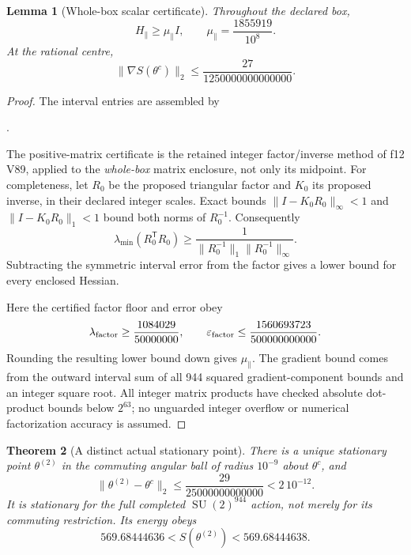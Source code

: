 \documentclass[11pt,oneside]{article}
\newtheorem{theorem}{Theorem}[section]
\newtheorem{lemma}[theorem]{Lemma}
\DeclareMathOperator{\SU}{SU}
\begin{document}
\begin{lemma}[Whole-box scalar certificate]
\label{lem:f13v8-scalar}
Throughout the declared box,
\[
 H_\parallel\ge
 \mu_\parallel I,\qquad
 \mu_\parallel=\frac{1855919}{10^8}.
\]
At the rational centre,
\[
 \|\nabla S(\theta^c)\|_2
 \le\frac{27}{1250000000000000}.
\]
\end{lemma}

\begin{proof}
The interval entries are assembled by
\begin{center}\small
{}.
\end{center}
The positive-matrix certificate is the
retained integer factor/inverse method of
f12 V89, applied to the \emph{whole-box}
matrix enclosure, not only its midpoint.
For completeness, let \(R_0\) be the proposed
triangular factor and \(K_0\) its proposed
inverse, in their declared integer scales.
Exact bounds
\(\|I-K_0R_0\|_\infty<1\) and
\(\|I-K_0R_0\|_1<1\) bound both norms of
\(R_0^{-1}\). Consequently
\[
 \lambda_{\min}(R_0^{\mathsf T}R_0)
 \ge\frac1{\|R_0^{-1}\|_1\|R_0^{-1}\|_\infty}.
\]
Subtracting the symmetric interval error
from the factor gives a lower bound for
every enclosed Hessian.

Here the certified factor floor and error obey
\[
 \lambda_{\rm factor}\ge\frac{1084029}{50000000},
 \qquad
 \varepsilon_{\rm factor}\le\frac{1560693723}{500000000000}.
\]
Rounding the resulting lower bound down
gives \(\mu_\parallel\). The gradient bound
comes from the outward interval sum of
all 944 squared gradient-component bounds
and an integer square root. All integer
matrix products have checked absolute
dot-product bounds below \(2^{63}\);
no unguarded integer overflow or numerical
factorization accuracy is assumed.
\end{proof}

\begin{theorem}[A distinct actual stationary point]
\label{thm:f13v8-stationary}
There is a unique stationary point
\(\theta^{(2)}\) in the commuting angular
ball of radius \(10^{-9}\) about
\(\theta^c\), and
\[
 \|\theta^{(2)}-\theta^c\|_2
 \le\frac{29}{25000000000000}
 <2\,10^{-12}.
\]
It is stationary for the full completed
\(\SU(2)^{944}\) action, not merely for its
commuting restriction. Its energy obeys
\[
 569.68444636<S(\theta^{(2)})<569.68444638.
\]
\end{theorem}
\end{document}
